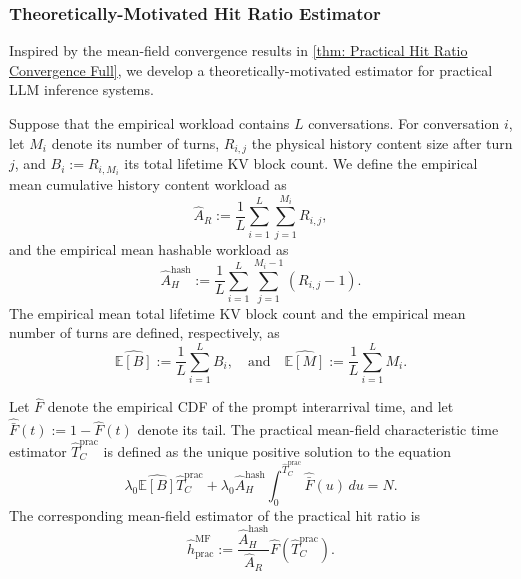 \documentclass{article}
\theoremstyle{definition}
\newcommand{\E}{\mathbb E}
\begin{document}
\subsubsection{Theoretically-Motivated Hit Ratio Estimator}
\label{sssec: Theoretically-Motivated Hit Ratio Estimator}

Inspired by the mean-field convergence results in \cref{thm: Practical Hit Ratio Convergence Full}, we develop a theoretically-motivated estimator for practical LLM inference systems.

Suppose that the empirical workload contains $L$ conversations. For conversation $i$, let $M_i$ denote its number of turns, $R_{i,j}$ the physical history content size after turn $j$, and $B_i:=R_{i,M_i}$ its total lifetime KV block count. We define the empirical mean cumulative history content workload as
\begin{equation}
\label{equ: practical estimator AR}
    \widehat A_R := \frac{1}{L} \sum_{i=1}^{L} \sum_{j=1}^{M_i}R_{i,j},
\end{equation}
and the empirical mean hashable workload as
\begin{equation}
\label{equ: practical estimator AH hash}
    \widehat A_H^{\mathrm{hash}} := \frac{1}{L} \sum_{i=1}^{L} \sum_{j=1}^{M_i-1}(R_{i,j}-1).
\end{equation}
The empirical mean total lifetime KV block count and the empirical mean number of turns are defined, respectively, as
\begin{equation}
\label{equ: practical estimator moments}
    \widehat{\E[B]} := \frac{1}{L}\sum_{i=1}^{L}B_i, \quad \text{and}\quad \widehat{\E[M]} :=\frac{1}{L}\sum_{i=1}^{L}M_i.
\end{equation}

Let $\widehat F$ denote the empirical CDF of the prompt interarrival time, and let $\widehat{\bar F}(t):=1-\widehat F(t)$ denote its tail. The practical mean-field characteristic time estimator $\widehat T_C^{\mathrm{prac}}$ is defined as the unique positive solution to the equation
\begin{equation}
\label{equ: practical TC estimator}
    \lambda_0 \widehat{\E[B]}\widehat T_C^{\mathrm{prac}}+\lambda_0 \widehat A_H^{\mathrm{hash}}\int_0^{\widehat T_C^{\mathrm{prac}}}\widehat{\bar F}(u)\,du=N.
\end{equation}
The corresponding mean-field estimator of the practical hit ratio is
\begin{equation}
\label{equ: practical hit ratio estimator}
    \widehat h_{ \mathrm{prac}}^{\mathrm{MF}}:=\frac{\widehat A_H^{\mathrm{hash}}}{\widehat A_R}\widehat F\left(\widehat T_C^{\mathrm{prac}}\right).
\end{equation}
\end{document}
